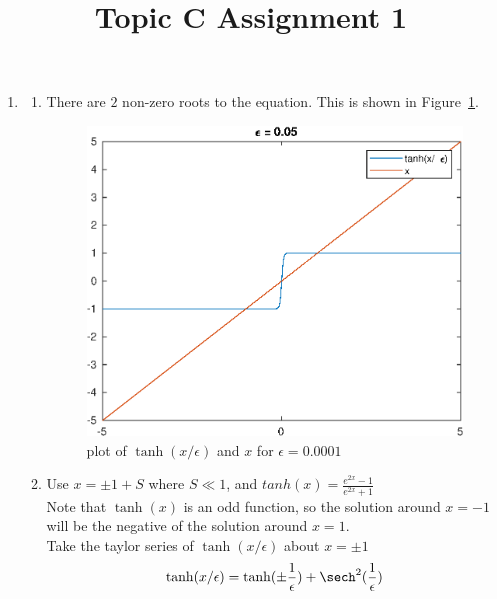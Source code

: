 \documentclass{/home/janmebows/Documents/LatexTemplates/myassignment}
\title{Topic C Assignment 1}
\begin{document}
\maketitle
\begin{enumerate}
    \item 
    \begin{enumerate}
        \item There are $2$ non-zero roots to the equation. This is shown in Figure~\ref{fig::tanhx}.\\
        \begin{figure}
            \centering
            \label{fig::tanhx}
            \includegraphics{TopicCA1Q1a.eps}
            \caption{plot of $\tanh(x/\epsilon)$ and $x$ for $\epsilon=0.0001$}
        \end{figure}
        \item Use $x = \pm 1 + S$ where $S\ll 1$, and $tanh(x) = \frac{e^{2x}-1}{e^{2x}+1}$\\
        Note that $\tanh(x)$ is an odd function, so the solution around $x=-1$ will be the negative of the solution around $x =1$.\\

        Take the taylor series of $\tanh(x/\epsilon)$ about $x = \pm 1$
        \[\tanh(x/\epsilon) = \tanh(\pm \frac1\epsilon) + \sech^2(\frac1\epsilon)\]


\end{enumerate}
\end{enumerate}
\end{document}
